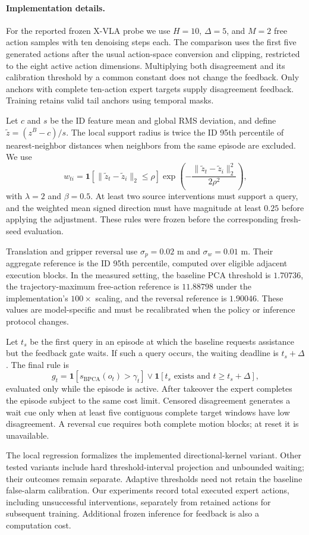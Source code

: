 \paragraph{Implementation details.}
For the reported frozen X-VLA probe we use $H=10$, $\Delta=5$, and $M=2$
free action samples with ten denoising steps each. The comparison uses the
first five generated actions after the usual action-space conversion and
clipping, restricted to the eight active action dimensions. Multiplying
both disagreement and its calibration threshold by a common constant
does not change the feedback. Only anchors with complete ten-action expert
targets supply disagreement feedback. Training retains valid tail anchors
using temporal masks.

Let $c$ and $s$ be the ID feature mean and global RMS deviation, and define
$\widetilde z=(z^B-c)/s$. The local support radius is twice the ID 95th
percentile of nearest-neighbor distances when neighbors from the same
episode are excluded. We use
\begin{equation}
w_{ti}=\mathbf{1}[\|\widetilde z_t-\widetilde z_i\|_2\le\rho]
\exp\!\left(-\frac{\|\widetilde z_t-\widetilde z_i\|_2^2}{2\rho^2}\right),
\end{equation}
with $\lambda=2$ and $\beta=0.5$. At least two source interventions must
support a query, and the weighted mean signed direction must have magnitude
at least $0.25$ before applying the adjustment. These rules were frozen
before the corresponding fresh-seed evaluation.

Translation and gripper reversal use $\sigma_p=0.02$ m and
$\sigma_w=0.01$ m. Their aggregate reference is the ID 95th percentile,
computed over eligible adjacent execution blocks. In the measured setting,
the baseline PCA threshold is $1.70736$, the trajectory-maximum free-action
reference is $11.88798$ under the implementation's $100\times$ scaling, and
the reversal reference is $1.90046$. These values are model-specific and
must be recalibrated when the policy or inference protocol changes.

Let $t_s$ be the first query in an episode at which the baseline requests
assistance but the feedback gate waits. If such a query occurs, the waiting
deadline is $t_s+\Delta$. The final rule is
\begin{equation}
g_t=\mathbf{1}[s_{\mathrm{BPCA}}(o_t)>\gamma_t]
\lor\mathbf{1}[t_s\text{ exists and }t\ge t_s+\Delta],
\end{equation}
evaluated only while the episode is active. After takeover the expert
completes the episode subject to the same cost limit. Censored disagreement
generates a wait cue only when at least five contiguous complete target
windows have low disagreement. A reversal cue requires both complete
motion blocks; at reset it is unavailable.

The local regression formalizes the implemented directional-kernel variant.
Other tested variants include hard threshold-interval projection and
unbounded waiting; their outcomes remain separate. Adaptive thresholds
need not retain the baseline false-alarm calibration. Our experiments
record total executed expert actions, including unsuccessful interventions,
separately from retained actions for subsequent training. Additional frozen
inference for feedback is also a computation cost.

